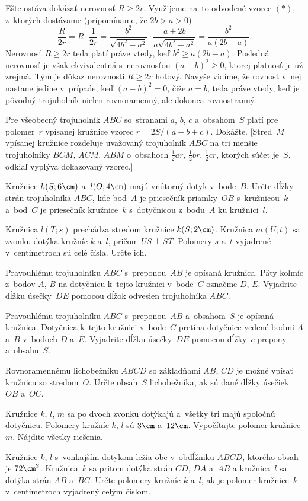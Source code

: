 {Ešte ostáva dokázať nerovnosť $R\ge2r$.
Využijeme na~to odvodené vzorce $(*)$, z~ktorých dostávame
(pripomíname, že $2b>a>0$)
$$
\frac{R}{2r}=
{R}\cdot\frac{1}{2r}=\frac{b^2}{\sqrt{4b^2-a^2}}\cdot
\frac{a+2b}{a\sqrt{4b^2-a^2}}=\frac{b^2}{a(2b-a)}.
$$
Nerovnosť $R\ge2r$ teda platí práve vtedy, keď
$b^2\ge a(2b-a)$. Posledná
nerovnosť je však ekvivalentná s~nerovnosťou $(a-b)^2\ge0$,
ktorej platnosť je už zrejmá. Tým je dôkaz nerovnosti $R\ge2r$
hotový. Navyše vidíme, že rovnosť v~nej nastane
jedine v~prípade, keď $(a-b)^2=0$, čiže $a=b$, teda práve vtedy, keď
je pôvodný trojuholník nielen rovnoramenný, ale dokonca rovnostranný.

Pre všeobecný trojuholník $ABC$ so~stranami $a$, $b$, $c$ a~obsahom~$S$
platí pre polomer~$r$ vpísanej kružnice vzorec $r=2S/(a+b+c)$.
Dokážte. [Stred~$M$ vpísanej kružnice rozdeľuje uvažovaný trojuholník
$ABC$ na tri menšie trojuholníky $BCM$, $ACM$, $ABM$ o~obsahoch
$\frac12ar$, $\frac12br$, $\frac12cr$, ktorých súčet je~$S$, odkiaľ vyplýva dokazovaný vzorec.]

Kružnice $k(S;6\cm)$ a~$l(O;4\cm)$ majú vnútorný dotyk v~bode~$B$.
Určte dĺžky strán trojuholníka $ABC$, kde bod~$A$ je priesečník priamky~$OB$
s~kružnicou~$k$ a~bod~$C$ je priesečník kružnice~$k$ s~dotyčnicou z~bodu~$A$
ku kružnici~$l$.
\vpravo{[59--C--S--2]}

Kružnica $l(T; s)$ prechádza stredom kružnice $k(S;2\cm)$.
Kružnica $m(U; t)$ sa zvonku dotýka kružníc  $k$ a~$l$, pričom
$US\perp ST$.
Polomery $s$ a~$t$ vyjadrené v~centimetroch sú celé čísla. Určte ich.
\vpravo{[59--B--II--1]}

Pravouhlému trojuholníku $ABC$ s~preponou~$AB$ je opísaná kružnica.
Päty kolmíc z~bodov $A$, $B$ na dotyčnicu k~tejto kružnici v~bode~$C$
označme $D$, $E$. Vyjadrite dĺžku úsečky~$DE$ pomocou dĺžok
odvesien trojuholníka $ABC$.
\vpravo{[58--C--I--2]}

Pravouhlému trojuholníku $ABC$ s~preponou~$AB$ a~obsahom~$S$
je opísaná kružnica. Dotyčnica k~tejto kružnici v~bode~$C$ pretína
dotyčnice vedené bodmi $A$ a~$B$ v~bodoch $D$ a~$E$.
Vyjadrite dĺžku úsečky~$DE$ pomocou dĺžky~$c$ prepony
a~obsahu~$S$.
\vpravo{[58--C--II--4]}

Rovnoramennému lichobežníku $ABCD$ so základňami $AB$, $CD$ je možné
vpísať kružnicu so stredom~$O$. Určte obsah~$S$ lichobežníka,
ak sú dané dĺžky úsečiek $OB$ a~$OC$.
\vpravo{[56--C--II--3]}

Kružnice $k$, $l$, $m$ sa po dvoch zvonku dotýkajú a~všetky tri majú spoločnú dotyčnicu.
Polomery kružníc $k$, $l$ sú $3\cm$ a~$12\cm$. Vypočítajte polomer kružnice $m$.
Nájdite všetky riešenia.
\vpravo{[55--C--I--2]}

Kružnice $k$, $l$ s~vonkajším dotykom ležia obe
v~obdĺžniku $ABCD$, ktorého obsah je $72\cm^2$. Kružnica~$k$ sa
pritom dotýka strán $CD$, $DA$ a~$AB$ a kružnica~$l$ sa dotýka
strán $AB$ a~$BC$.  Určte polomery  kružníc $k$ a~$l$,
ak je polomer kružnice~$k$ v~centimetroch vyjadrený celým číslom.
\vpravo{[55--C--II--3]}
}

